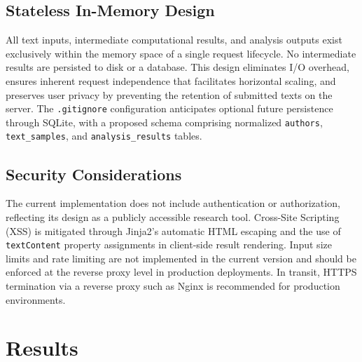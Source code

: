 \documentclass[conference]{IEEEtran}
\begin{document}
\subsection{Stateless In-Memory Design}

All text inputs, intermediate computational results, and analysis outputs exist
exclusively within the memory space of a single request lifecycle. No
intermediate results are persisted to disk or a database. This design
eliminates I/O overhead, ensures inherent request independence that facilitates
horizontal scaling, and preserves user privacy by preventing the retention of
submitted texts on the server. The \texttt{.gitignore} configuration
anticipates optional future persistence through SQLite, with a proposed schema
comprising normalized \texttt{authors}, \texttt{text\_samples}, and
\texttt{analysis\_results} tables.

\subsection{Security Considerations}

The current implementation does not include authentication or authorization,
reflecting its design as a publicly accessible research tool. Cross-Site
Scripting (XSS) is mitigated through Jinja2's automatic HTML escaping and
the use of \texttt{textContent} property assignments in client-side result
rendering. Input size limits and rate limiting are not implemented in the
current version and should be enforced at the reverse proxy level in production
deployments. In transit, HTTPS termination via a reverse proxy such as Nginx
is recommended for production environments.

\section{Results}
\label{sec:results}

%
\end{document}
